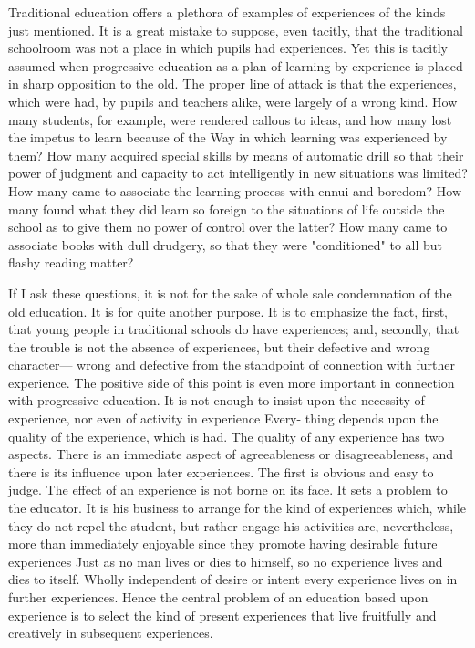 Traditional education offers a plethora of examples of experiences of the kinds just 
mentioned. It is a great mistake to suppose, even tacitly, that the traditional schoolroom 
was not a place in which pupils had experiences. Yet this is tacitly assumed when 
progressive education as a plan of learning by experience is placed in sharp opposition to 
the old. The proper line of attack is that the experiences, which were had, by pupils and 
teachers alike, were largely of a wrong kind. How many students, for example, were 
rendered callous to ideas, and how many lost the impetus to learn because of the Way in 
which learning was experienced by them? How many acquired special skills by means of 
automatic drill so that their power of judgment and capacity to act intelligently in new 
situations was limited? How many came to associate the learning process with ennui and 
boredom? How many found what they did learn so foreign to the situations of life outside 
the school as to give them no power of control over the latter? How many came to 
associate books with dull drudgery, so that they were "conditioned" to all but flashy 
reading matter? 

If I ask these questions, it is not for the sake of whole sale condemnation of the old 
education. It is for quite another purpose. It is to emphasize the fact, first, that young 
people in traditional schools do have experiences; and, secondly, that the trouble is not 
the absence of experiences, but their defective and wrong character— wrong and defective 
from the standpoint of connection with further experience. The positive side of this point 
is even more important in connection with progressive education. It is not enough to 
insist upon the necessity of experience, nor even of activity in experience Every- thing 
depends upon the quality of the experience, which is had. The quality of any experience 
has two aspects. There is an immediate aspect of agreeableness or disagreeableness, and 
there is its influence upon later experiences. The first is obvious and easy to judge. The 
effect of an experience is not borne on its face. It sets a problem to the educator. It is his 
business to arrange for the kind of experiences which, while they do not repel the student, 
but rather engage his activities are, nevertheless, more than immediately enjoyable since 
they promote having desirable future experiences Just as no man lives or dies to himself, 
so no experience lives and dies to itself. Wholly independent of desire or intent every 
experience lives on in further experiences. Hence the central problem of an education 
based upon experience is to select the kind of present experiences that live fruitfully and 
creatively in subsequent experiences. 

